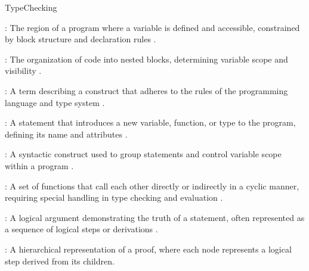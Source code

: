 \documentclass[hidelinks]{article}
\begin{document}
\begin{smodule}[title={Type Checking}]{TypeChecking}
    \begin{sdefinition}[for=VariableScope]
        : The region of a program where a variable is defined and accessible, constrained by block structure and declaration rules .
    \end{sdefinition}

    \begin{sdefinition}[for=BlockStructure]
        : The organization of code into nested blocks, determining variable scope and visibility .
    \end{sdefinition}

    \begin{sdefinition}[for=Valid]
        : A term describing a construct that adheres to the rules of the programming language and type system .
    \end{sdefinition}

    \begin{sdefinition}[for=Declaration]
        : A statement that introduces a new variable, function, or type to the program, defining its name and attributes .
    \end{sdefinition}

    \begin{sdefinition}[for=Block]
        : A syntactic construct used to group statements and control variable scope within a program .
    \end{sdefinition}

    \begin{sdefinition}[for=MutuallyRecursiveFunctions]
        : A set of functions that call each other directly or indirectly in a cyclic manner, requiring special handling in type checking and evaluation .
    \end{sdefinition}

    \begin{sdefinition}[for=Proof]
        : A logical argument demonstrating the truth of a statement, often represented as a sequence of logical steps or derivations .
    \end{sdefinition}

    \begin{sdefinition}[for=ProofTree]
        : A hierarchical representation of a proof, where each node represents a logical step derived from its children.
    \end{sdefinition}

\end{smodule}
\end{document}
